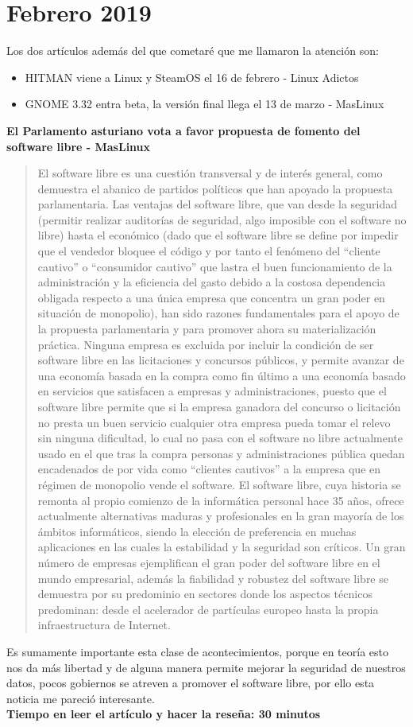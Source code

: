 \documentclass[a4paper, 11pt, oneside]{article}
\begin{document}
\section*{Febrero 2019}
Los dos artículos además del que cometaré que me llamaron la atención son:
\begin{itemize}
    \item HITMAN viene a Linux y SteamOS el 16 de febrero - Linux Adictos
    \item GNOME 3.32 entra beta, la versión final llega el 13 de marzo - MasLinux
\end{itemize}
\textbf{El Parlamento asturiano vota a favor propuesta de fomento del software libre - MasLinux}
\begin{quote}
    El software libre es una cuestión transversal y de interés general, como demuestra el abanico de partidos políticos que han apoyado la propuesta parlamentaria. Las ventajas del software libre, que van desde la seguridad (permitir realizar auditorías de seguridad, algo imposible con el software no libre) hasta el económico (dado que el software libre se define por impedir que el vendedor bloquee el código y por tanto el fenómeno del “cliente cautivo” o “consumidor cautivo” que lastra el buen funcionamiento de la administración y la eficiencia del gasto debido a la costosa dependencia obligada respecto a una única empresa que concentra un gran poder en situación de monopolio), han sido razones fundamentales para el apoyo de la propuesta parlamentaria y para promover ahora su materialización práctica. Ninguna empresa es excluida por incluir la condición de ser software libre en las licitaciones y concursos públicos, y permite avanzar de una economía basada en la compra como fin último a una economía basado en servicios que satisfacen a empresas y administraciones, puesto que el software libre permite que si la empresa ganadora del concurso o licitación no presta un buen servicio cualquier otra empresa pueda tomar el relevo sin ninguna dificultad, lo cual no pasa con el software no libre actualmente usado en el que tras la compra personas y administraciones pública quedan encadenados de por vida como “clientes cautivos” a la empresa que en régimen de monopolio vende el software. El software libre, cuya historia se remonta al propio comienzo de la informática personal hace 35 años, ofrece actualmente alternativas maduras y profesionales en la gran mayoría de los ámbitos informáticos, siendo la elección de preferencia en muchas aplicaciones en las cuales la estabilidad y la seguridad son críticos. Un gran número de empresas ejemplifican el gran poder del software libre en el mundo empresarial, además la fiabilidad y robustez del software libre se demuestra por su predominio en sectores donde los aspectos técnicos predominan: desde el acelerador de partículas europeo hasta la propia infraestructura de Internet.
\end{quote}
Es sumamente importante esta clase de acontecimientos, porque en teoría esto nos da más libertad y de alguna manera permite mejorar la seguridad de nuestros datos, pocos gobiernos se atreven a promover el software libre, por ello esta noticia me pareció interesante.\\
\textbf{Tiempo en leer el artículo y hacer la reseña: 30 minutos}
\end{document}
